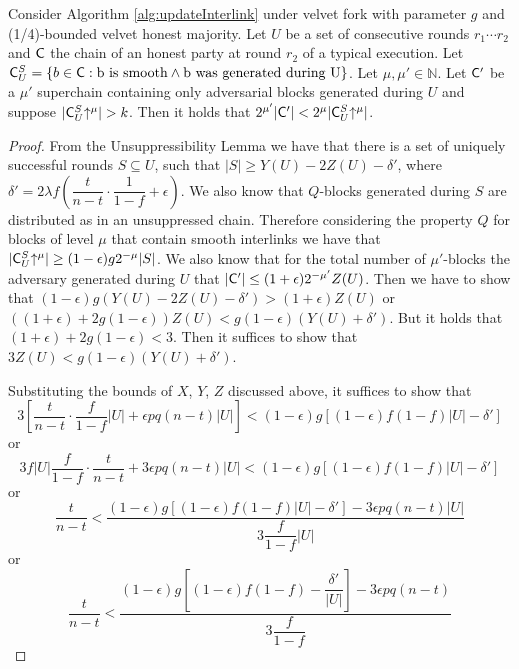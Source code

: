 \begin{lemma}\label{lem:claim3_lemma}
   Consider Algorithm \ref{alg:updateInterlink} under velvet fork with parameter $g$ and (1/4)-bounded velvet honest majority. Let $U$ be a set of consecutive rounds $r_1 \cdots r_2$ and $\mathsf{C}$ the chain of an honest party at round $r_2$ of a typical execution. Let $\mathsf{C}^S_U = \{b \in \mathsf{C}: \text{b is smooth} \land \text{b was generated during U} \}$. Let $\mu, \mu' \in \mathbb{N}$.
   Let $\mathsf{C}'$ be a $\mu'$ superchain containing only adversarial blocks generated during $U$ and suppose $\lvert \mathsf{C}^S_U\negthickspace\uparrow^{\mu} \rvert > k$. Then it holds that
   $2^{\mu'}\lvert \mathsf{C}' \rvert < 2^{\mu}\lvert \mathsf{C}^S_U\negthickspace\uparrow^{\mu} \rvert $.
\end{lemma}
\begin{proof}
  From the Unsuppressibility Lemma we have that there is a set of uniquely
  successful rounds $S \subseteq U$, such that
  $\lvert S \rvert \geq Y(U) - 2Z(U) - \delta'$, where
  $\delta' = 2 \lambda f (\dfrac{t}{n-t} \cdot \dfrac{1}{1-f} + \epsilon)$.
  We also know that $Q$-blocks generated during $S$ are distributed as in an
  unsuppressed chain. Therefore considering the property $Q$ for blocks of
  level $\mu$ that contain smooth interlinks we have that
  $\lvert \mathsf{C}^S_U\negthickspace\uparrow^{\mu} \rvert \geq (1-\epsilon)g2^{-\mu} \lvert S \rvert$.
  We also know that for the total number of $\mu'$-blocks the adversary
  generated during $U$ that
  $\lvert \mathsf{C}' \rvert \leq (1+\epsilon)2^{-\mu'}Z(U)$.
  Then we have to show that
  $(1-\epsilon)g (Y(U) - 2Z(U) - \delta' ) > (1+\epsilon)Z(U)$ or
  $((1+\epsilon)+2g(1-\epsilon))Z(U) < g(1-\epsilon)(Y(U) + \delta')$.
  But it holds that $ (1+\epsilon)+2g(1-\epsilon) < 3$. Then it suffices to show that
  $3Z(U) < g(1-\epsilon)(Y(U) + \delta')$.

Substituting the bounds of $X$, $Y$, $Z$ discussed above, it suffices to show that
\begin{equation*}
    3[\dfrac{t}{n-t} \cdot \dfrac{f}{1-f} \lvert U \rvert + \epsilon pq(n-t) \lvert U \rvert ] < (1- \epsilon)g[ (1-\epsilon)f(1-f) \lvert U \rvert - \delta' ]
\end{equation*} or
\begin{equation*}
        3f \lvert U \rvert \dfrac{f}{1-f}\cdot \dfrac{t}{n-t} + 3 \epsilon pq(n-t) \lvert U \rvert < (1- \epsilon)g[ (1-\epsilon)f(1-f) \lvert U \rvert - \delta' ]
\end{equation*} or
\begin{equation*}
        \dfrac{t}{n-t} < \dfrac{ (1- \epsilon)g[ (1-\epsilon)f(1-f) \lvert U \rvert - \delta' ] - 3\epsilon pq(n-t) \lvert U \rvert }  { 3 \dfrac{f}{1-f} \lvert U \rvert}
\end{equation*} or
\begin{equation*}
    \dfrac{t}{n-t} < \dfrac{  (1- \epsilon)g[ (1-\epsilon)f(1-f) - \dfrac{\delta'}{\lvert U \rvert} ] - 3 \epsilon pq(n-t) }  { 3\dfrac{f}{1-f}}
\end{equation*}


\end{proof}
